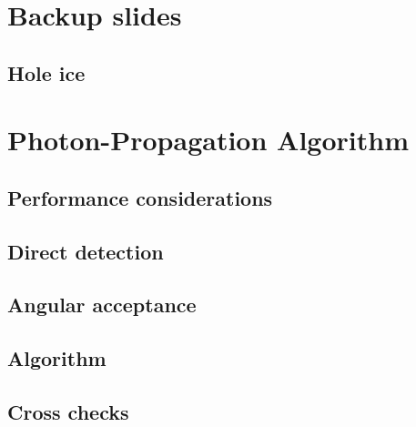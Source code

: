 \documentclass[green, 12pt]{beamer}
\begin{document}
\appendix
\section{Backup slides}

\subsection{Hole ice}
  

\section{Photon-Propagation Algorithm}
   

\subsection{Performance considerations}
  
  
  

\subsection{Direct detection}
  

\subsection{Angular acceptance}
  
  

\subsection{Algorithm}
  

\subsection{Cross checks}
  
  
  
  
\end{document}
